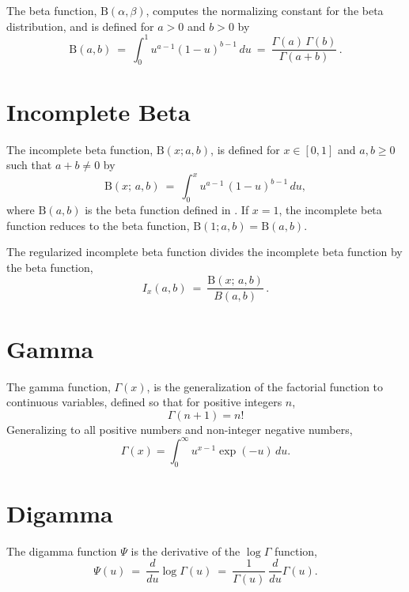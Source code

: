 The beta function, $\mbox{B}(\alpha,\beta)$, computes the normalizing
constant for the beta distribution, and is defined for $a > 0$ and $b
> 0$ by
%
\[
\mbox{B}(a,b)
\ = \
\int_0^1 u^{a - 1} (1 - u)^{b - 1} \, du
\ = \
\frac{\Gamma(a) \, \Gamma(b)}{\Gamma(a+b)} \, .
\]

\section{Incomplete Beta}\label{inc-beta-appendix.section}

The incomplete beta function, $\mathrm{B}(x; a, b)$, is defined for
$x \in [0, 1]$ and $a, b \geq 0$ such that $a + b \neq 0$ by
\[
\mathrm{B}(x; \, a, b)
\ = \
\int_0^x u^{a -  1} \, (1 - u)^{b - 1} \, du,
\]
%
where $\mathrm{B}(a, b)$ is the beta function defined in
.  If $x = 1$, the incomplete beta function
reduces to the beta function, $\mathrm{B}(1; a, b) = \mathrm{B}(a,
b)$.

The regularized incomplete beta function divides the incomplete beta
function by the beta function,
\[
I_x(a, b) \ = \ \frac{\mathrm{B}(x; \, a, b)}{B(a, b)} \, .
\]




\section{Gamma}\label{gamma-appendix.section}

The gamma function, $\Gamma(x)$, is the generalization of the
factorial function to continuous variables, defined so that for
positive integers $n$,
\[
\Gamma(n+1) = n!
\]
%
Generalizing to all positive numbers and non-integer negative numbers,
\[
\Gamma(x) = \int_0^{\infty} u^{x - 1} \exp(-u) \, du.
\]


\section{Digamma}\label{digamma-appendix.section}

The digamma function $\Psi$ is the derivative of the $\log \Gamma$
function,
%
\[
\Psi(u)
\ = \
\frac{d}{d u} \log \Gamma(u)
\ = \
\frac{1}{\Gamma(u)} \ \frac{d}{d u} \Gamma(u).
\]
